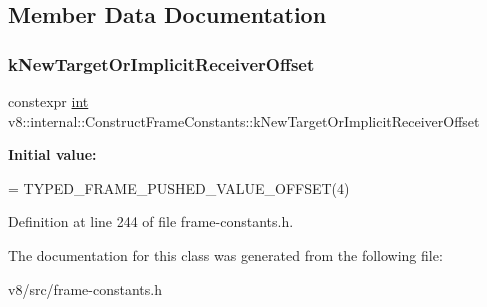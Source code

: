 \subsection{Member Data Documentation}
\mbox{\label{classv8_1_1internal_1_1ConstructFrameConstants_a461b0b4fed577ebcef8b930e074b58f9}} 
\subsubsection{\texorpdfstring{k\+New\+Target\+Or\+Implicit\+Receiver\+Offset}{kNewTargetOrImplicitReceiverOffset}}
{\footnotesize\ttfamily constexpr \mbox{\hyperlink{classint}{int}} v8\+::internal\+::\+Construct\+Frame\+Constants\+::k\+New\+Target\+Or\+Implicit\+Receiver\+Offset\hspace{0.3cm}{\ttfamily [static]}}

{\bfseries Initial value\+:}
\begin{DoxyCode}
=
      TYPED\_FRAME\_PUSHED\_VALUE\_OFFSET(4)
\end{DoxyCode}


Definition at line 244 of file frame-\/constants.\+h.



The documentation for this class was generated from the following file\+:\begin{DoxyCompactItemize}
\item 
v8/src/frame-\/constants.\+h\end{DoxyCompactItemize}
